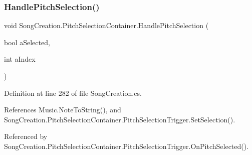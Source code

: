 \subsubsection{\texorpdfstring{Handle\+Pitch\+Selection()}{HandlePitchSelection()}}
{\footnotesize\ttfamily void Song\+Creation.\+Pitch\+Selection\+Container.\+Handle\+Pitch\+Selection (\begin{DoxyParamCaption}\item[{bool}]{a\+Selected,  }\item[{int}]{a\+Index }\end{DoxyParamCaption})}



Definition at line 282 of file Song\+Creation.\+cs.



References Music.\+Note\+To\+String(), and Song\+Creation.\+Pitch\+Selection\+Container.\+Pitch\+Selection\+Trigger.\+Set\+Selection().



Referenced by Song\+Creation.\+Pitch\+Selection\+Container.\+Pitch\+Selection\+Trigger.\+On\+Pitch\+Selected().


